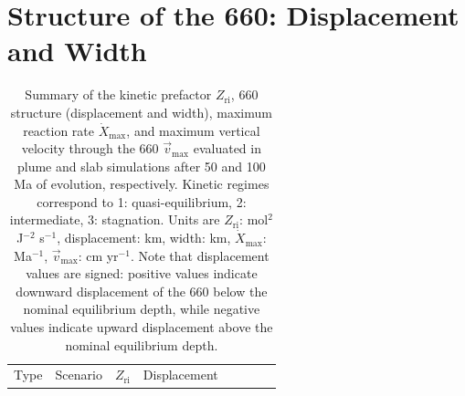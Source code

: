 \documentclass[final]{agujournal2019}
\begin{document}
\clearpage

\section*{Structure of the 660: Displacement and
Width}\label{sec:structure-of-the-660}

\clearpage

\begin{longtable}[]{@{}
  >{\raggedright\arraybackslash}p{}
  >{\raggedleft\arraybackslash}p{}
  >{\raggedleft\arraybackslash}p{}
  >{\raggedleft\arraybackslash}p{}
  >{\raggedleft\arraybackslash}p{}
  >{\raggedleft\arraybackslash}p{}
  >{\raggedleft\arraybackslash}p{}
  >{\raggedleft\arraybackslash}p{}@{}}
\caption{Summary of the kinetic prefactor \(Z_\mathrm{ri}\), 660
structure (displacement and width), maximum reaction rate
\(\dot{X}_\mathrm{max}\), and maximum vertical velocity through the 660
\(\vec{v}_\mathrm{max}\) evaluated in plume and slab simulations after
50 and 100 Ma of evolution, respectively. Kinetic regimes correspond to
1: quasi-equilibrium, 2: intermediate, 3: stagnation. Units are
\(Z_\mathrm{ri}\): mol\(^2\) J\(^{-2}\) s\(^{-1}\), displacement: km,
width: km, \(\dot{X}_\mathrm{max}\): Ma\(^{-1}\),
\(\vec{v}_\mathrm{max}\): cm yr\(^{-1}\). Note that displacement values
are signed: positive values indicate downward displacement of the 660
below the nominal equilibrium depth, while negative values indicate
upward displacement above the nominal equilibrium
depth.}\label{tbl:depth-profile-summary}\tabularnewline
\toprule\noalign{}
\begin{minipage}[b]{\linewidth}\raggedright
Type
\end{minipage} & \begin{minipage}[b]{\linewidth}\raggedleft
Scenario
\end{minipage} & \begin{minipage}[b]{\linewidth}\raggedleft
\(Z_\mathrm{ri}\)
\end{minipage} & \begin{minipage}[b]{\linewidth}\raggedleft
Displacement
\end{minipage} & \begin{minipage}[b]{\linewidth}\raggedleft

\end{minipage}
\end{longtable}
\end{document}
